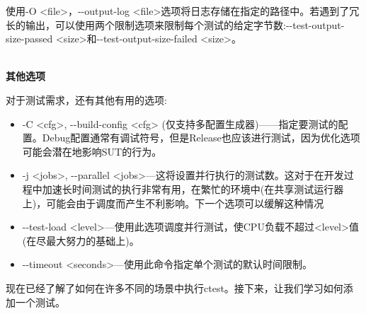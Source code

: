 使用-O <file>，-{}-output-log <file>选项将日志存储在指定的路径中。若遇到了冗长的输出，可以使用两个限制选项来限制每个测试的给定字节数:-{}-test-output-size-passed <size>和-{}-test-output-size-failed <size>。

\hspace*{\fill} \\ %
\noindent
\textbf{其他选项}

对于测试需求，还有其他有用的选项:

\begin{itemize}
\item 
-C <cfg>, -{}-build-config <cfg> (仅支持多配置生成器)——指定要测试的配置。Debug配置通常有调试符号，但是Release也应该进行测试，因为优化选项可能会潜在地影响SUT的行为。

\item 
-j <jobs>, -{}-parallel <jobs>—这将设置并行执行的测试数。这对于在开发过程中加速长时间测试的执行非常有用，在繁忙的环境中(在共享测试运行器上)，可能会由于调度而产生不利影响。下一个选项可以缓解这种情况

\item 
-{}-test-load <level>—使用此选项调度并行测试，使CPU负载不超过<level>值(在尽最大努力的基础上)。

\item 
-{}-timeout <seconds>—使用此命令指定单个测试的默认时间限制。
\end{itemize}

现在已经了解了如何在许多不同的场景中执行ctest。接下来，让我们学习如何添加一个测试。


























